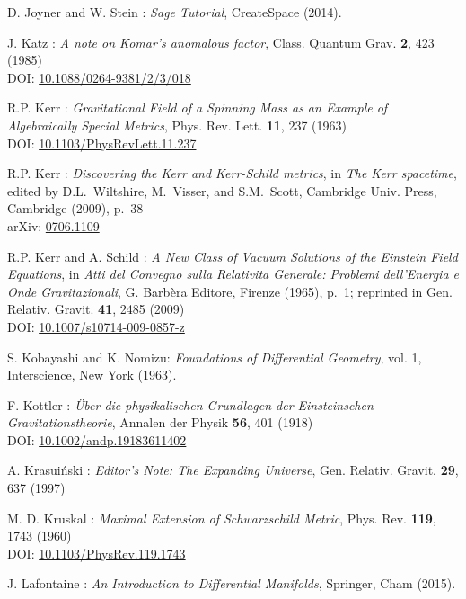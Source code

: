 \begin{thebibliography}{123}
D. Joyner and W. Stein : {\em Sage Tutorial}, CreateSpace (2014).

J. Katz :
{\em A note on Komar's anomalous factor},
Class. Quantum Grav. {\bf 2}, 423 (1985)\\
DOI: \href{https://doi.org/10.1088/0264-9381/2/3/018}{10.1088/0264-9381/2/3/018}

R.P. Kerr :
{\em Gravitational Field of a Spinning Mass as an Example of Algebraically Special Metrics},
Phys. Rev. Lett. {\bf 11}, 237 (1963)\\
DOI: \href{https://doi.org/10.1103/PhysRevLett.11.237}{10.1103/PhysRevLett.11.237}

R.P. Kerr : {\em Discovering the Kerr and Kerr-Schild metrics},
in {\em The Kerr spacetime}, edited by D.L.~Wiltshire, M.~Visser, and S.M.~Scott,
Cambridge Univ. Press, Cambridge (2009), p.~38\\
arXiv: \href{https://arxiv.org/abs/0706.1109}{0706.1109}

R.P. Kerr and A. Schild :
{\em A New Class of Vacuum Solutions of the Einstein Field Equations},
in {\em Atti del Convegno sulla Relativita Generale: Problemi
dell’Energia e Onde Gravitazionali}, G. Barbèra Editore,
Firenze (1965), p.~1; reprinted in
Gen. Relativ. Gravit. {\bf 41}, 2485 (2009)\\
DOI: \href{https://doi.org/10.1007/s10714-009-0857-z}{10.1007/s10714-009-0857-z}

S. Kobayashi and K. Nomizu:
{\em Foundations of Differential Geometry}, vol. 1,
Interscience, New York (1963).

F.  Kottler :
{\em \"Uber die physikalischen Grundlagen der Einsteinschen Gravitationstheorie},
Annalen der Physik {\bf 56}, 401 (1918)\\
DOI: \href{https://doi.org/10.1002/andp.19183611402}{10.1002/andp.19183611402}

A. Krasui\'nski :
{\em Editor's Note: The Expanding Universe},
Gen. Relativ. Gravit. {\bf 29}, 637 (1997)

M. D. Kruskal :
{\em Maximal Extension of Schwarzschild Metric},
Phys. Rev. {\bf 119}, 1743 (1960)\\
DOI: \href{https://doi.org/10.1103/PhysRev.119.1743}{10.1103/PhysRev.119.1743}

J. Lafontaine : {\em An Introduction to Differential Manifolds},
Springer, Cham (2015).


\end{thebibliography}
